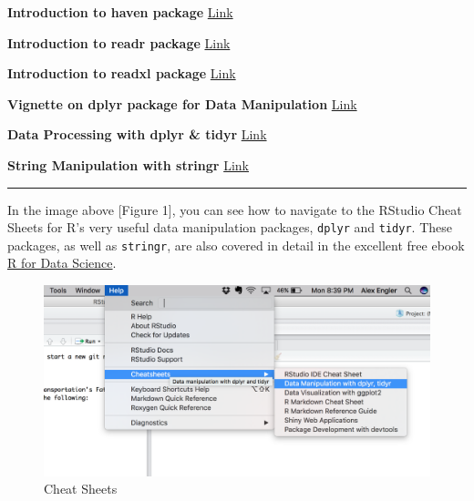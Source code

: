 \documentclass[]{article}
\begin{document}
\textbf{Introduction to haven package}
\href{https://blog.rstudio.org/2015/03/04/haven-0-1-0/}{Link}

\textbf{Introduction to readr package}
\href{https://github.com/tidyverse/readr}{Link}

\textbf{Introduction to readxl package}
\href{https://github.com/tidyverse/readxl}{Link}

\textbf{Vignette on dplyr package for Data Manipulation}
\href{https://cran.rstudio.com/web/packages/dplyr/vignettes/introduction.html}{Link}

\textbf{Data Processing with dplyr \& tidyr}
\href{https://rpubs.com/bradleyboehmke/data_wrangling}{Link}

\textbf{String Manipulation with stringr}
\href{https://cran.r-project.org/web/packages/stringr/vignettes/stringr.html}{Link}

\begin{center}\rule{0.5\linewidth}{\linethickness}\end{center}

In the image above {[}Figure 1{]}, you can see how to navigate to the
RStudio Cheat Sheets for R's very useful data manipulation packages,
\texttt{dplyr} and \texttt{tidyr}. These packages, as well as
\texttt{stringr}, are also covered in detail in the excellent free ebook
\href{http://r4ds.had.co.nz/transform.html}{R for Data Science}.

\begin{figure}
\centering
\includegraphics{./cheat.png}
\caption{Cheat Sheets}
\end{figure}
\end{document}
